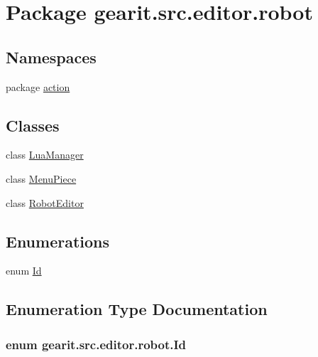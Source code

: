 \hypertarget{namespacegearit_1_1src_1_1editor_1_1robot}{\section{Package gearit.\+src.\+editor.\+robot}
\label{namespacegearit_1_1src_1_1editor_1_1robot}
}
\subsection*{Namespaces}
\begin{DoxyCompactItemize}
\item 
package \hyperlink{namespacegearit_1_1src_1_1editor_1_1robot_1_1action}{action}
\end{DoxyCompactItemize}
\subsection*{Classes}
\begin{DoxyCompactItemize}
\item 
class \hyperlink{classgearit_1_1src_1_1editor_1_1robot_1_1_lua_manager}{Lua\+Manager}
\item 
class \hyperlink{classgearit_1_1src_1_1editor_1_1robot_1_1_menu_piece}{Menu\+Piece}
\item 
class \hyperlink{classgearit_1_1src_1_1editor_1_1robot_1_1_robot_editor}{Robot\+Editor}
\end{DoxyCompactItemize}
\subsection*{Enumerations}
\begin{DoxyCompactItemize}
\item 
enum \hyperlink{namespacegearit_1_1src_1_1editor_1_1robot_a807597c07a2bb2873079c5528afd0843}{Id} 
\end{DoxyCompactItemize}


\subsection{Enumeration Type Documentation}
\hypertarget{namespacegearit_1_1src_1_1editor_1_1robot_a807597c07a2bb2873079c5528afd0843}{
\subsubsection[{Id}]{\setlength{\rightskip}{0pt plus 5cm}enum {\bf gearit.\+src.\+editor.\+robot.\+Id}}}\label{namespacegearit_1_1src_1_1editor_1_1robot_a807597c07a2bb2873079c5528afd0843}
